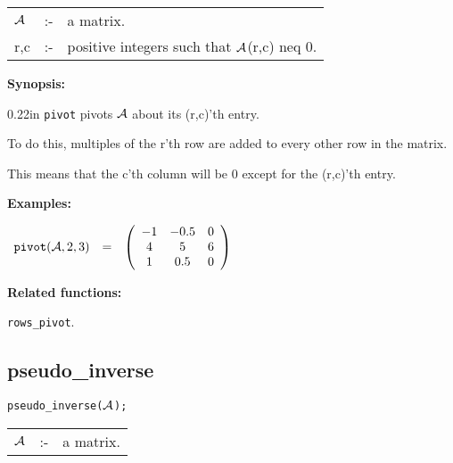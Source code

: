 \hspace*{0.1in}  
\begin{tabular}{l l l} 
${\cal A}$ &:-& a matrix. \\
r,c        &:-& positive integers such that ${\cal A}$(r,c) neq 0.
\end{tabular}

{\bf Synopsis:} %

\begin{addtolength}{\leftskip}{0.22in}
{\tt pivot} pivots ${\cal A}$ about its (r,c)'th entry.
 
To do this, multiples of the r'th row are added to every
     other row in the matrix. 

This means that the c'th column
                will be 0 except for the (r,c)'th entry. 

\end{addtolength}

{\bf Examples:}

\begin{flushleft}  
\hspace*{0.1in}
\begin{math}  
\begin{array}{ccc}
{\tt pivot}({\cal A},2,3) & = & 
        \left( \begin{array}{ccc} -1 & -0.5 & 0 \\ 4 & 5 & 6 \\ 1 & 0.5 
& 0
 \end{array} \right) 
\end{array}
\end{math}  
\end{flushleft}

{\bf Related functions:}

\hspace*{0.175in} {\tt rows\_pivot}.


\subsection{pseudo\_inverse}


\hspace*{0.175in} {\tt pseudo\_inverse(${\cal A}$);}

\hspace*{0.1in}  
\begin{tabular}{l l l} 
${\cal A}$ &:-& a matrix.
\end{tabular}


